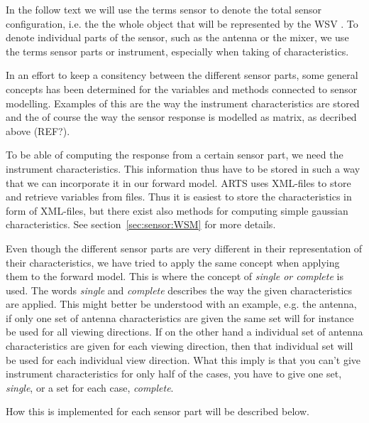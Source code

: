 In the follow text we will use the terms sensor to denote the total
sensor configuration, i.e. the the whole object that will be
represented by the WSV . To denote 
individual parts of the sensor, such as the antenna or the mixer, we
use the terms sensor parts or instrument, especially when taking
of characteristics.


In an effort to keep a consitency between the different sensor parts, 
some general concepts has been determined for the variables and 
methods connected to sensor modelling.
Examples of this are the way the instrument characteristics are 
stored and the of course the way the sensor response is modelled 
as matrix, as decribed above (REF?).


To be able of computing the response from a certain sensor part, we 
need the instrument characteristics. This information thus have to 
be stored in such a way that we can incorporate it in our forward 
model. ARTS uses XML-files to store and retrieve variables from 
files. Thus it is easiest to store the characteristics in form of 
XML-files, but there exist also methods for computing simple gaussian
characteristics. See section~\ref{sec:sensor:WSM} for more details.

Even though the different sensor parts are very different in their
representation of their characteristics, we have tried to apply the 
same concept when applying them to the forward model. This is where
the concept of \textit{single or complete} is used. The words 
\textit{single} and \textit{complete} describes the way the given 
characteristics are applied. This might better be understood with an
example, e.g. the antenna, if only one set of antenna characteristics
are given the same set will for instance be used for all viewing
directions. If on the other hand a individual set of antenna 
characteristics are given for each viewing direction, then that
individual set will be used for each individual view direction.
What this imply is that you can't give instrument characteristics
for only half of the cases, you have to give one set, \textit{single},
or a set for each case, \textit{complete}.

How this is implemented for each sensor part will be described below.

